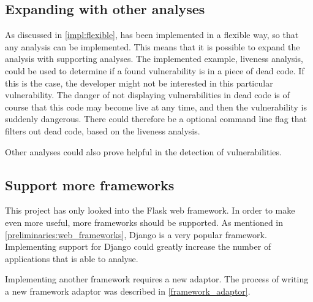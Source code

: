 \subsection{Expanding \pyt{} with other analyses}
As discussed in \cref{impl:flexible}, \pyt{} has been implemented in a flexible way, so that any analysis can be implemented.
This means that it is possible to expand the analysis with supporting analyses.
The implemented example, liveness analysis, could be used to determine if a found vulnerability is in a piece of dead code.
If this is the case, the developer might not be interested in this particular vulnerability.
The danger of not displaying vulnerabilities in dead code is of course that this code may become live at any time, and then the vulnerability is suddenly dangerous.
There could therefore be a optional command line flag that filters out dead code, based on the liveness analysis.

Other analyses could also prove helpful in the detection of vulnerabilities.

\subsection{Support more frameworks}
This project has only looked into the Flask web framework.
In order to make \pyt{} even more useful, more frameworks should be supported.
As mentioned in \cref{preliminaries:web_frameworks}, Django is a very popular framework.
Implementing support for Django could greatly increase the number of applications that \pyt{} is able to analyse.

Implementing another framework requires a new adaptor.
The process of writing a new framework adaptor was described in \cref{framework_adaptor}.
